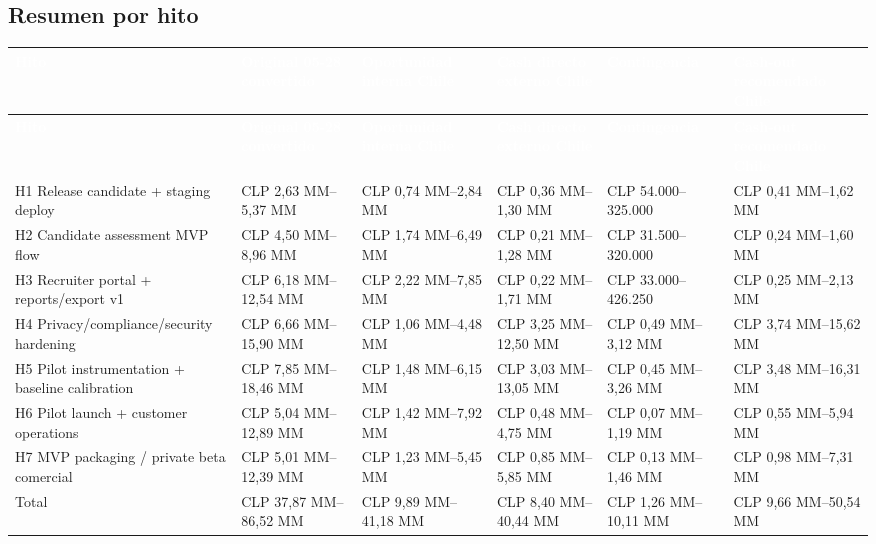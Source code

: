 \documentclass[11pt,a4paper]{article}
\begin{document}
\clearpage
\begin{landscape}
\section{Resumen por hito}
\small
\begin{longtable}{@{}p{5.3cm}p{3.1cm}p{3.3cm}p{3.3cm}p{2.8cm}p{3.3cm}@{}}
\toprule
\rowcolor{KDark}\textcolor{white}{\textbf{Hito}} & \textcolor{white}{\textbf{Original 05-28 convertido}} & \textcolor{white}{\textbf{Oportunidad interna Chile}} & \textcolor{white}{\textbf{Cash directo externo Chile}} & \textcolor{white}{\textbf{Contingencia}} & \textcolor{white}{\textbf{Cash-out recomendado Chile}} \\
\midrule
\endfirsthead
\toprule
\rowcolor{KDark}\textcolor{white}{\textbf{Hito}} & \textcolor{white}{\textbf{Original 05-28 convertido}} & \textcolor{white}{\textbf{Oportunidad interna Chile}} & \textcolor{white}{\textbf{Cash directo externo Chile}} & \textcolor{white}{\textbf{Contingencia}} & \textcolor{white}{\textbf{Cash-out recomendado Chile}} \\
\midrule
\endhead
H1 Release candidate + staging deploy & CLP 2,63 MM--5,37 MM & CLP 0,74 MM--2,84 MM & CLP 0,36 MM--1,30 MM & CLP 54.000--325.000 & CLP 0,41 MM--1,62 MM \\
H2 Candidate assessment MVP flow & CLP 4,50 MM--8,96 MM & CLP 1,74 MM--6,49 MM & CLP 0,21 MM--1,28 MM & CLP 31.500--320.000 & CLP 0,24 MM--1,60 MM \\
H3 Recruiter portal + reports/export v1 & CLP 6,18 MM--12,54 MM & CLP 2,22 MM--7,85 MM & CLP 0,22 MM--1,71 MM & CLP 33.000--426.250 & CLP 0,25 MM--2,13 MM \\
H4 Privacy/compliance/security hardening & CLP 6,66 MM--15,90 MM & CLP 1,06 MM--4,48 MM & CLP 3,25 MM--12,50 MM & CLP 0,49 MM--3,12 MM & CLP 3,74 MM--15,62 MM \\
H5 Pilot instrumentation + baseline calibration & CLP 7,85 MM--18,46 MM & CLP 1,48 MM--6,15 MM & CLP 3,03 MM--13,05 MM & CLP 0,45 MM--3,26 MM & CLP 3,48 MM--16,31 MM \\
H6 Pilot launch + customer operations & CLP 5,04 MM--12,89 MM & CLP 1,42 MM--7,92 MM & CLP 0,48 MM--4,75 MM & CLP 0,07 MM--1,19 MM & CLP 0,55 MM--5,94 MM \\
H7 MVP packaging / private beta comercial & CLP 5,01 MM--12,39 MM & CLP 1,23 MM--5,45 MM & CLP 0,85 MM--5,85 MM & CLP 0,13 MM--1,46 MM & CLP 0,98 MM--7,31 MM \\
Total & CLP 37,87 MM--86,52 MM & CLP 9,89 MM--41,18 MM & CLP 8,40 MM--40,44 MM & CLP 1,26 MM--10,11 MM & CLP 9,66 MM--50,54 MM \\

\bottomrule
\end{longtable}
\normalsize
\end{landscape}
\clearpage
\end{document}
